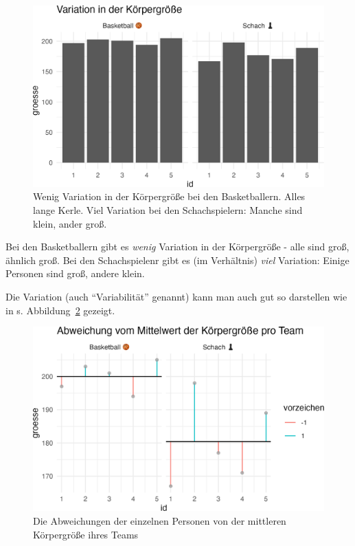\documentclass[
  a4paper,
  DIV=11]{scrreprt}
\theoremstyle{definition}
\theoremstyle{definition}
\theoremstyle{remark}
\begin{document}
\begin{figure}

{\centering \includegraphics{./fragenstellen_files/figure-pdf/fig-groesse-1.png}

}

\caption{\label{fig-groesse}Wenig Variation in der Körpergröße bei den
Basketballern. Alles lange Kerle. Viel Variation bei den Schachspielern:
Manche sind klein, ander groß.}

\end{figure}

Bei den Basketballern gibt es \emph{wenig} Variation in der Körpergröße
- alle sind groß, ähnlich groß. Bei den Schachspielenr gibt es (im
Verhältnis) \emph{viel} Variation: Einige Personen sind groß, andere
klein.

Die Variation (auch ``Variabilität'' genannt) kann man auch gut so
darstellen wie in s. Abbildung~\ref{fig-variab} gezeigt.

\begin{figure}

{\centering \includegraphics{./fragenstellen_files/figure-pdf/fig-variab-1.png}

}

\caption{\label{fig-variab}Die Abweichungen der einzelnen Personen von
der mittleren Körpergröße ihres Teams}

\end{figure}
\end{document}
